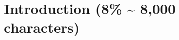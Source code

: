 \documentclass[12pt]{scrartcl}
\numberwithin{equation}{section}				%
\begin{document}
    \tableofcontents
    
    \section{Introduction (8\% \; \textasciitilde{} 8,000 characters)}
    
    
    
    
\end{document}
